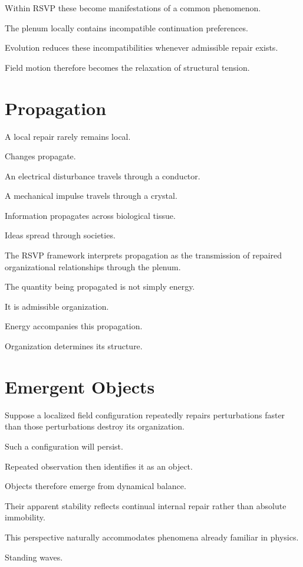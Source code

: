 \documentclass[11pt,oneside]{book}
\numberwithin{equation}{chapter}
\theoremstyle{definition}
\theoremstyle{plain}
\begin{document}
Within RSVP these become manifestations of a common phenomenon.

The plenum locally contains incompatible continuation preferences.

Evolution reduces these incompatibilities whenever admissible repair exists.

Field motion therefore becomes the relaxation of structural tension.

\section{Propagation}

A local repair rarely remains local.

Changes propagate.

An electrical disturbance travels through a conductor.

A mechanical impulse travels through a crystal.

Information propagates across biological tissue.

Ideas spread through societies.

The RSVP framework interprets propagation as the transmission of repaired
organizational relationships through the plenum.

The quantity being propagated is not simply energy.

It is admissible organization.

Energy accompanies this propagation.

Organization determines its structure.

\section{Emergent Objects}

Suppose a localized field configuration repeatedly repairs perturbations
faster than those perturbations destroy its organization.

Such a configuration will persist.

Repeated observation then identifies it as an object.

Objects therefore emerge from dynamical balance.

Their apparent stability reflects continual internal repair rather than
absolute immobility.

This perspective naturally accommodates phenomena already familiar in
physics.

Standing waves.
\end{document}
